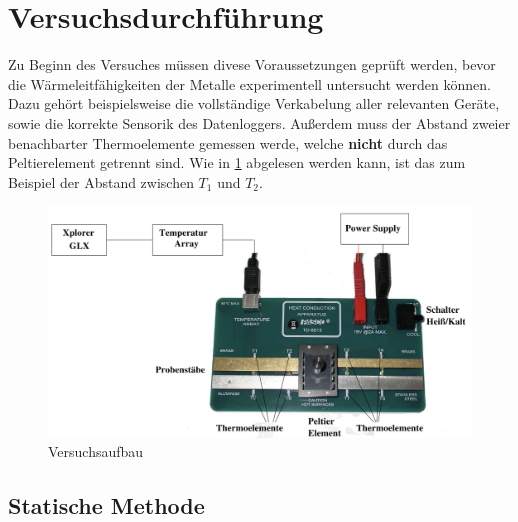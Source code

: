 %

%
\section{Versuchsdurchführung}
\label{sec:Versuchsdurchführung}

Zu Beginn des Versuches müssen divese Voraussetzungen geprüft werden, bevor die Wärmeleitfähigkeiten der Metalle experimentell untersucht werden können.
Dazu gehört beispielsweise die vollständige Verkabelung aller relevanten Geräte, sowie die korrekte Sensorik des Datenloggers. Außerdem muss der Abstand 
zweier benachbarter Thermoelemente gemessen werde, welche \textbf{nicht} durch das Peltierelement getrennt sind. Wie in \ref{fig:Versuchsaufbau} abgelesen werden kann,
ist das zum Beispiel der Abstand zwischen $T_1$ und $T_2$. 

\begin{figure}
    \centering
    \includegraphics[width=\textwidth]{Versuchsaufbau_v204.png}
    \caption{Versuchsaufbau}
    \label{fig:Versuchsaufbau}
\end{figure}

\subsection{Statische Methode}
\label{sec:Statische Methode}

